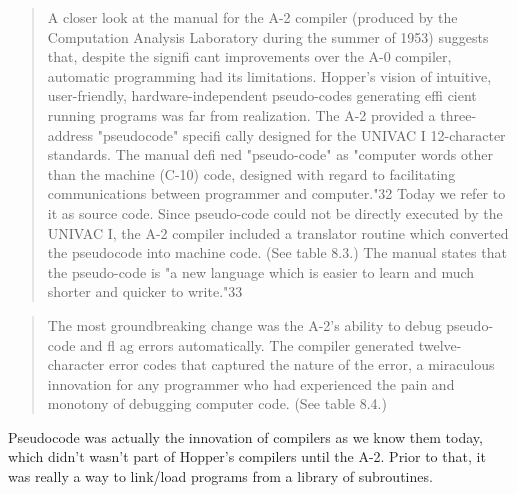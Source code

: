 \begin{quotation}
A closer look at the manual for the A-2 compiler (produced
by the Computation Analysis Laboratory during the summer of
1953) suggests that, despite the signifi cant improvements over
the A-0 compiler, automatic programming had its limitations.
Hopper's vision of intuitive, user-friendly, hardware-independent
pseudo-codes generating effi cient running programs was far
from realization. The A-2 provided a three-address "pseudocode" specifi cally designed for the UNIVAC I 12-character standards. The manual defi ned "pseudo-code" as "computer words
other than the machine (C-10) code, designed with regard to
facilitating communications between programmer and computer."32 Today we refer to it as source code. Since pseudo-code
could not be directly executed by the UNIVAC I, the A-2 compiler included a translator routine which converted the pseudocode into machine code. (See table 8.3.)
The manual states that the pseudo-code is "a new language
which is easier to learn and much shorter and quicker to write."33
\end{quotation}

\begin{quotation}
 The most groundbreaking change was the A-2's ability to debug
pseudo-code and fl ag errors automatically. The compiler generated twelve-character error codes that captured the nature of the
error, a miraculous innovation for any programmer who had
experienced the pain and monotony of debugging computer
code. (See table 8.4.)
\end{quotation}

Pseudocode was actually the innovation of compilers as we know them today,
which didn't wasn't part of Hopper's compilers until the A-2.
Prior to that, it was really a way to link/load programs from a library of subroutines.

